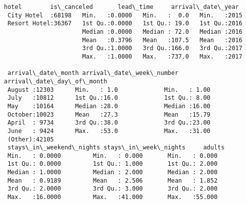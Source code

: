 \documentclass[11pt]{article}
\begin{document}
    
    \begin{Verbatim}[commandchars=\\\{\}]
          hotel        is\_canceled       lead\_time     arrival\_date\_year
 City Hotel  :68198   Min.   :0.0000   Min.   :  0.0   Min.   :2015     
 Resort Hotel:36367   1st Qu.:0.0000   1st Qu.: 19.0   1st Qu.:2016     
                      Median :0.0000   Median : 72.0   Median :2016     
                      Mean   :0.3796   Mean   :107.5   Mean   :2016     
                      3rd Qu.:1.0000   3rd Qu.:166.0   3rd Qu.:2017     
                      Max.   :1.0000   Max.   :737.0   Max.   :2017     
                                                                        
 arrival\_date\_month arrival\_date\_week\_number arrival\_date\_day\_of\_month
 August :12303      Min.   : 1.0             Min.   : 1.00            
 July   :10812      1st Qu.:16.0             1st Qu.: 8.00            
 May    :10164      Median :28.0             Median :16.00            
 October:10023      Mean   :27.3             Mean   :15.79            
 April  : 9734      3rd Qu.:38.0             3rd Qu.:23.00            
 June   : 9424      Max.   :53.0             Max.   :31.00            
 (Other):42105                                                        
 stays\_in\_weekend\_nights stays\_in\_week\_nights     adults      
 Min.   : 0.0000         Min.   : 0.000       Min.   : 0.000  
 1st Qu.: 0.0000         1st Qu.: 1.000       1st Qu.: 2.000  
 Median : 1.0000         Median : 2.000       Median : 2.000  
 Mean   : 0.9189         Mean   : 2.506       Mean   : 1.852  
 3rd Qu.: 2.0000         3rd Qu.: 3.000       3rd Qu.: 2.000  
 Max.   :16.0000         Max.   :41.000       Max.   :55.000  
                                                              

\end{Verbatim}
\end{document}
